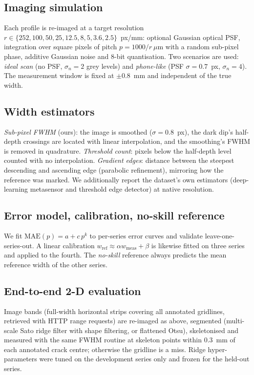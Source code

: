 \documentclass[conference]{IEEEtran}
\begin{document}
\subsection{Imaging simulation}
Each profile is re-imaged at a target resolution $r\in\{252,100,50,25,12.5,8,5,3.6,2.5\}$~px/mm: optional Gaussian optical
PSF, integration over square pixels of pitch $p=1000/r~\mu$m with a random sub-pixel phase, additive Gaussian noise and 8-bit
quantisation. Two scenarios are used: \emph{ideal scan} (no PSF, $\sigma_n=2$ grey levels) and \emph{phone-like}
(PSF $\sigma=0.7$~px, $\sigma_n=4$). The measurement window is fixed at $\pm0.8$~mm and independent of the true width.

\subsection{Width estimators}
\emph{Sub-pixel FWHM} (ours): the image is smoothed ($\sigma=0.8$~px), the dark dip's half-depth crossings are located with linear interpolation, and the
smoothing's FWHM is removed in quadrature. \emph{Threshold count}: pixels below the half-depth level counted with no interpolation.
\emph{Gradient edges}: distance between the steepest descending and ascending edge (parabolic refinement), mirroring how the reference was marked.
We additionally report the dataset's own estimators (deep-learning metasensor and threshold edge detector) at native resolution.

\subsection{Error model, calibration, no-skill reference}
We fit $\mathrm{MAE}(p)=a+c\,p^{k}$ to per-series error curves and validate leave-one-series-out. A linear calibration
$w_\mathrm{ref}\approx \alpha w_\mathrm{meas}+\beta$ is likewise fitted on three series and applied to the fourth. The \emph{no-skill}
reference always predicts the mean reference width of the other series.

\subsection{End-to-end 2-D evaluation}
Image bands (full-width horizontal strips covering all annotated gridlines, retrieved with HTTP range requests) are re-imaged as above, segmented
(multi-scale Sato ridge filter with shape filtering, or flattened Otsu), skeletonised and measured with the same FWHM routine at skeleton points within 0.3~mm
of each annotated crack centre; otherwise the gridline is a miss. Ridge hyper-parameters were tuned on the development series only and frozen for the held-out series.
\end{document}
